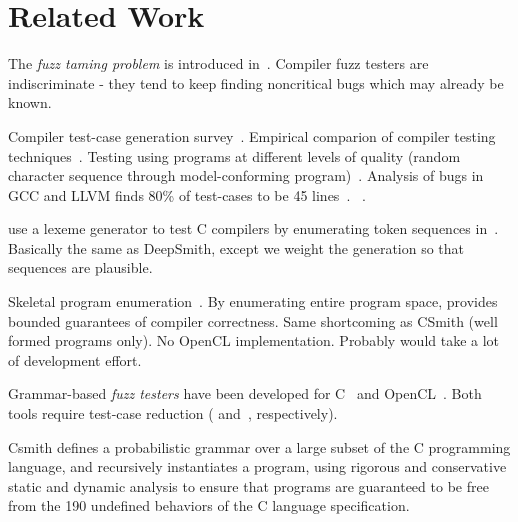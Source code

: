 \section{Related Work}\label{sec:rw}


The \emph{fuzz taming problem} is introduced in~\cite{Chen2013}. Compiler fuzz testers are indiscriminate - they tend to keep finding noncritical bugs which may already be known.

 Compiler test-case generation survey~\cite{Boujarwah1997}. Empirical comparion of compiler testing techniques~\cite{Chen2014a}. Testing using programs at different levels of quality (random character sequence through model-conforming program)~\cite{McKeeman1998}. Analysis of bugs in GCC and LLVM finds 80\% of test-cases to be 45 lines~\cite{Sun2016}. ~\cite{Godefroid2008a,Le2015,Sun2016a}.

\citeauthor{McKeeman1998} use a lexeme generator to test C compilers by enumerating token sequences in~\cite{McKeeman1998}. Basically the same as DeepSmith, except we weight the generation so that sequences are plausible.

Skeletal program enumeration~\cite{Zhang2016a}. By enumerating entire program space, provides bounded guarantees of compiler correctness. Same shortcoming as CSmith (well formed programs only). No OpenCL implementation. Probably would take a lot of development effort. 

Grammar-based \emph{fuzz testers} have been developed for C~\cite{Yang2011} and OpenCL~\cite{Lidbury2015a}. Both tools require test-case reduction (\cite{Regehr2012a} and~\cite{Pflanzer2016}, respectively).

Csmith defines a probabilistic grammar over a large subset of the C programming language, and recursively instantiates a program, using rigorous and conservative static and dynamic analysis to ensure that programs are guaranteed to be free from the 190 undefined behaviors of the C language specification.

